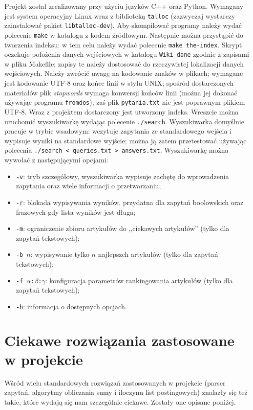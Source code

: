 \documentclass[a4paper,12pt]{article}
\begin{document}
Projekt został zrealizowany przy użyciu języków C++ oraz Python. Wymagany jest
system operacyjny Linux wraz z biblioteką \texttt{talloc} (zazwyczaj wystarczy
zainstalować pakiet \texttt{libtalloc-dev}). Aby skompilować programy należy
wydać polecenie \texttt{make} w katalogu z kodem źródłowym. Następnie można
przystąpić do tworzenia indeksu: w tem celu należy wydać polecenie
\texttt{make the-index}. Skrypt oczekuje położenia danych wejściowych w katalogu
\texttt{Wiki\_dane} zgodnie z zapisami w pliku Makefile; zapisy te należy
dostosować do rzeczywistej lokalizacji danych wejściowych. Należy zwrócić uwagę
na kodowanie znaków w plikach; wymagane jest kodowanie UTF-8 oraz końce linii 
w stylu UNIX; spośród dostarczonych materiałów plik \textit{stopwords} wymaga
konwersji końców linii (można jej dokonać używając programu \texttt{fromdos}),
zaś plik \texttt{pytania.txt} nie jest poprawnym plikiem UTF-8. Wraz z projektem
dostarczony jest utworzony indeks. Wreszcie można uruchomić wyszukiwarkę wydając
polecenie \texttt{./search}. Wyszukiwarka domyślnie pracuje w trybie wsadowym:
wczytuje zapytania ze standardowego wejścia i wypisuje wyniki na standardowe
wyjście; można ją zatem przetestować używając polecenia \texttt{./search < queries.txt > answers.txt}.
Wyszukiwarkę można wywołać z następującymi opcjami:\begin{itemize}
  \item \texttt{-v}: tryb szczegółowy, wyszukiwarka wypisuje zachętę do
  wprowadzenia zapytania oraz wiele informacji o przetwarzaniu;
  \item \texttt{-r}: blokada wypisywania wyników, przydatna dla zapytań
  boolowskich oraz frazowych gdy lista wyników jest długa;
  \item \texttt{-m}: ograniczenie zbioru artykułów do ,,ciekawych artykułów''
  (tylko dla zapytań tekstowych);
  \item \texttt{-b $n$}: wypisywanie tylko $n$ najlepszch artykułów
  (tylko dla zapytań tekstowych);
  \item \texttt{-f $\alpha$:$\beta$:$\gamma$}: konfiguracja parametrów
  rankingowania artykułów (tylko dla zapytań tekstowych);
  \item \texttt{-h}: informacja o dostępnych opcjach.
\end{itemize}

\section{Ciekawe rozwiązania zastosowane w projekcie}
Wśród wielu standardowych rozwiązań zastosowanych w projekcie (parser zapytań,
algorytmy obliczania sumy i iloczynu list postingowych) znalazły się też takie,
które wydają się nam szczególnie ciekawe. Zostały one opisane poniżej.
\end{document}
